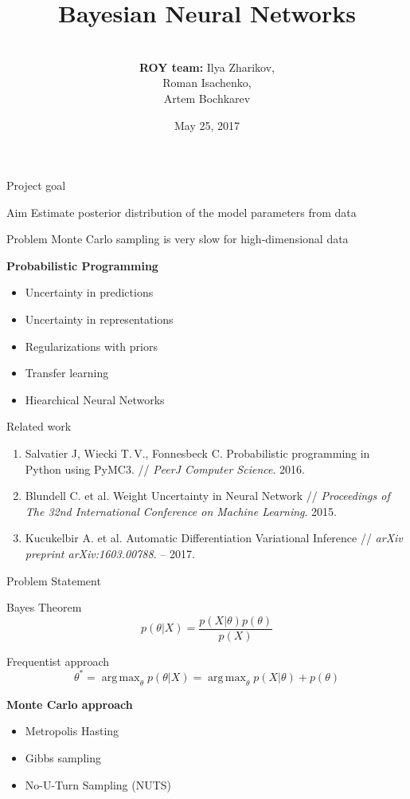 \documentclass{beamer}
\title[\hbox to 56mm{Bayesian Neural Networks  \hfill\insertframenumber\,/\,\inserttotalframenumber}]
{Bayesian Neural Networks}
\author[ROY team]{\\
	{\small \textbf{ROY team:} Ilya Zharikov, \\ \hspace{2.67cm}Roman Isachenko, \\ \hspace{2.61cm}Artem Bochkarev}}
\institute[SkolTech]{Skolkovo Institute of Science and Technology \\
	Bayesian Methods course 
	\vspace{0.3cm}
}
\date{May 25, 2017}
\DeclareMathOperator*{\argmax}{arg\,max}
\begin{document}
	\begin{frame}
		\titlepage
	\end{frame}
\begin{frame}{Project goal}
		
	\begin{block}{Aim}
		Estimate posterior distribution of the model parameters from data
	\end{block}
	\begin{block}{Problem}
		Monte Carlo sampling is very slow for high-dimensional data
	\end{block}	
	\textbf{Probabilistic Programming}
	\begin{itemize}
		\item Uncertainty in predictions
		\item Uncertainty in representations
		\item Regularizations with priors
		\item Transfer learning
		\item Hiearchical Neural Networks
	\end{itemize}
\end{frame}
\begin{frame}{Related work}
	\begin{enumerate}
		\item Salvatier J, Wiecki T.\,V., Fonnesbeck C. Probabilistic programming in Python using PyMC3. // \emph{PeerJ Computer Science}. 2016.
		\vfill
		\item Blundell C. et al. Weight Uncertainty in Neural Network // \emph{Proceedings of The 32nd International Conference on Machine Learning}. 2015.
		\vfill
		\item Kucukelbir A. et al. Automatic Differentiation Variational Inference // \emph{arXiv preprint arXiv:1603.00788}. – 2017.
	\end{enumerate}
	
\end{frame}
\begin{frame}{Problem Statement}
	\begin{block}{Bayes Theorem}
	\[
		p(\theta|X) = \frac{p(X|\theta) p(\theta)}{p(X)}
	\]
	\end{block}
	\begin{block}{Frequentist approach}
	\[
	\theta^* = \argmax_\theta p(\theta|X) =\argmax_\theta  p(X|\theta) + p(\theta)
	\]
	\end{block}
	\textbf{Monte Carlo approach}
	\begin{itemize}
		\item Metropolis Hasting
		\item Gibbs sampling
		\item No-U-Turn Sampling (NUTS)
	\end{itemize}
\end{frame}
\end{document}
